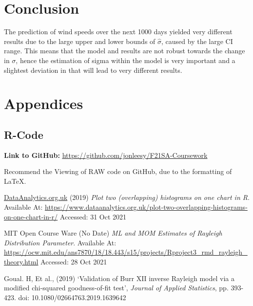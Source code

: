 \documentclass[11pt]{article}
\begin{document}
\section{Conclusion}
The prediction of wind speeds over the next 1000 days yielded very different results due to the large upper and lower bounds of $\hat{\sigma}$, caused by the large CI range. This means that the model and results are not robust towards the change in $\sigma$, hence the estimation of sigma within the model is very important and a slightest deviation in that will lead to very different results. 

\newpage
\section{Appendices}
\subsection{R-Code}
\textbf{Link to GitHub:} \href{https://github.com/jonleesy/F21SA-Coursework}{\underline{https://github.com/jonleesy/F21SA-Coursework}}
\par Recommend the Viewing of RAW code on GitHub, due to the formatting of \LaTeX.

\newpage
\begin{thebibliography}{9}

\bibitem{}
\url{DataAnalytics.org.uk} (2019) \textit{Plot two (overlapping) histograms on one chart in R}. Available At: \url{https://www.dataanalytics.org.uk/plot-two-overlapping-histograms-on-one-chart-in-r/} Accessed: 31 Oct 2021

\bibitem{}
MIT Open Course Ware (No Date) \textit{ML and MOM Estimates of Rayleigh Distribution Parameter}. Available At: \url{https://ocw.mit.edu/ans7870/18/18.443/s15/projects/Rproject3_rmd_rayleigh_theory.html} Accessed: 28 Oct 2021

\bibitem{}
Goual. H, Et al., (2019) `Validation of Burr XII inverse Rayleigh model via a modified chi-squared goodness-of-fit test', \textit{Journal of Applied Statistics}, pp. 393-423. doi: 10.1080/02664763.2019.1639642



\end{thebibliography}
\end{document}
